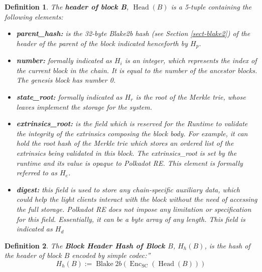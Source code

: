 \documentclass{book}
\newcommand{\assign}{:=}
\newcommand{\tmop}[1]{\ensuremath{\operatorname{#1}}}
\newcommand{\tmsamp}[1]{\textsf{#1}}
\newcommand{\tmstrong}[1]{\textbf{#1}}
\newcommand{\tmtextbf}[1]{{\bfseries{#1}}}
\newtheorem{definition}{Definition}
\newtheorem{definition}{Definition}
\begin{document}
\begin{definition}
  \label{defn-block-header}The {\tmstrong{header of block B}},
  {\tmstrong{$\tmop{Head} (B)$}} is a 5-tuple containing the following
  elements:
  \begin{itemize}
    \item \tmtextbf{{\tmsamp{parent\_hash:}}} is the 32-byte Blake2b hash (see
    Section \ref{sect-blake2}) of the header of the parent of the block
    indicated henceforth by \tmtextbf{$H_p$}.
    
    \item {\tmstrong{{\tmsamp{number:}}}} formally indicated as
    {\tmstrong{$H_i$}} is an integer, which represents the index of the
    current block in the chain. It is equal to the number of the ancestor
    blocks. The genesis block has number 0.
    
    \item {\tmstrong{{\tmsamp{state\_root:}}}} formally indicated as
    {\tmstrong{$H_r$}} is the root of the Merkle trie, whose leaves implement
    the storage for the system.
    
    \item {\tmstrong{{\tmsamp{extrinsics\_root:}}}} is the field which is
    reserved for the Runtime to validate the integrity of the extrinsics
    composing the block body. For example, it can hold the root hash of the
    Merkle trie which stores an ordered list of the extrinsics being validated
    in this block. The {\tmsamp{extrinsics\_root}} is set by the runtime and
    its value is opaque to Polkadot RE. This element is formally referred to
    as {\tmstrong{$H_e$}}.
    
    \item {\tmstrong{{\tmsamp{digest:}}}} this field is used to store any
    chain-specific auxiliary data, which could help the light clients interact
    with the block without the need of accessing the full storage. Polkadot RE
    does not impose any limitation or specification for this field.
    Essentially, it can be a byte array of any length. This field is indicated
    as {\tmstrong{$H_d$}}
  \end{itemize}
\end{definition}

\begin{definition}
  \label{defn-block-header-hash}The {\tmstrong{Block Header Hash of Block
  $B$}}, {\tmstrong{$H_h (B)$}}, is the hash of the header of block $B$
  encoded by simple codec:''
  \[ H_h (B) \assign \tmop{Blake} 2 b (\tmop{Enc}_{\tmop{SC}} (\tmop{Head}
     (B))) \]
\end{definition}
\end{document}
